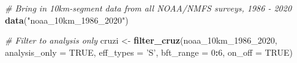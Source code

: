 \documentclass[
]{book}
\newenvironment{Shaded}{\begin{snugshade}}{\end{snugshade}}
\newcommand{\CommentTok}[1]{\textcolor[rgb]{0.56,0.35,0.01}{\textit{#1}}}
\newcommand{\DataTypeTok}[1]{\textcolor[rgb]{0.13,0.29,0.53}{#1}}
\newcommand{\DecValTok}[1]{\textcolor[rgb]{0.00,0.00,0.81}{#1}}
\newcommand{\KeywordTok}[1]{\textcolor[rgb]{0.13,0.29,0.53}{\textbf{#1}}}
\newcommand{\NormalTok}[1]{#1}
\newcommand{\OperatorTok}[1]{\textcolor[rgb]{0.81,0.36,0.00}{\textbf{#1}}}
\newcommand{\OtherTok}[1]{\textcolor[rgb]{0.56,0.35,0.01}{#1}}
\newcommand{\StringTok}[1]{\textcolor[rgb]{0.31,0.60,0.02}{#1}}
\begin{document}
\begin{Shaded}
\begin{Highlighting}[]
\CommentTok{# Bring in 10km-segment data from all NOAA/NMFS surveys, 1986 - 2020}
\KeywordTok{data}\NormalTok{(}\StringTok{"noaa_10km_1986_2020"}\NormalTok{)}
\end{Highlighting}
\end{Shaded}

\begin{Shaded}
\begin{Highlighting}[]
\CommentTok{# Filter to analysis only}
\NormalTok{cruzi <-}\StringTok{ }\KeywordTok{filter_cruz}\NormalTok{(noaa_10km_}\DecValTok{1986}\NormalTok{_}\DecValTok{2020}\NormalTok{,}
                     \DataTypeTok{analysis_only =} \OtherTok{TRUE}\NormalTok{,}
                     \DataTypeTok{eff_types =} \StringTok{'S'}\NormalTok{,}
                     \DataTypeTok{bft_range =} \DecValTok{0}\OperatorTok{:}\DecValTok{6}\NormalTok{,}
                     \DataTypeTok{on_off =} \OtherTok{TRUE}\NormalTok{)}
\end{Highlighting}
\end{Shaded}
\end{document}
